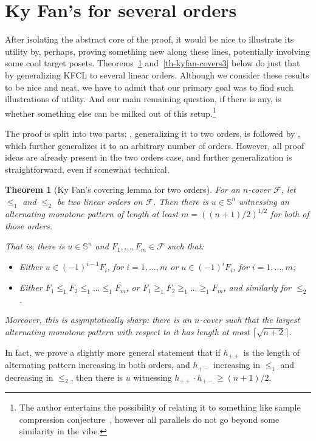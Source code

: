 \documentclass{article} %
\newcommand{\F}{\mathcal{F}}
\renewcommand{\SS}{\mathbb{S}}
\newtheorem{theorem}{Theorem}
\begin{document}
\section{Ky Fan's for several orders}\label{sec-several-orders}
After isolating the abstract core of the proof, it would be nice to illustrate its utility by, perhaps, proving something new along these lines, potentially involving some cool target posets. Theorems~\ref{th-kyfan-covers2} and~\ref{th-kyfan-covers3} below do just that by generalizing KFCL to several linear orders. Although we consider these results to be nice and neat, we have to admit that our primary goal was to find such illustrations of utility. And our main remaining question, if there is any, is whether something else can be milked out of this setup.\footnote{The author entertains the possibility of relating it to something like sample compression conjecture~\cite{fw95,lw86}, however all parallels do not go beyond some similarity in the vibe.}


The proof is split into two parts: , generalizing it to two orders, is followed by , which further generalizes it to an arbitrary number of orders. However, all proof ideas are already present in the two orders case, and further generalization is straightforward, even if somewhat technical.

\begin{theorem}[Ky Fan's covering lemma for two orders]\label{th-kyfan-covers2}
	For an $n$-cover $\F$, let $\leq_1$ and $\leq_2$ be two linear orders on $\F$. Then there is $u\in \SS^n$ witnessing an alternating monotone pattern of length at least $m = \left((n+1)/2\right)^{1/2}$ for both of those orders. 
	
	That is, there is $u\in \SS^n$ and $F_1, \dots, F_m\in \F$ such that:
	\begin{itemize}
		\item Either $u\in (-1)^{i-1}F_i$, for $i=1, \dots, m$ or $u\in (-1)^{i}F_i$, for $i=1, \dots, m$;
		\item Either $F_1\leq_1 F_2 \leq_1 \dots \leq_1 F_m$, or $F_1\geq_1 F_2 \geq_1 \dots \geq_1 F_m$, and similarly for $\leq_2$.
	\end{itemize}
    
    Moreover, this is asymptotically sharp: there is an $n$-cover such that the largest alternating monotone pattern with respect to it has length at most $\lceil\sqrt{n+2}\rceil$.
\end{theorem}
In fact, we prove a slightly more general statement that if $h_{++}$ is the length of alternating pattern increasing in both orders, and $h_{+-}$ increasing in $\leq_1$ and decreasing in $\leq_2$, then there is $u$ witnessing $h_{++} \cdot h_{+-} \geq (n+1)/2$.
\end{document}
